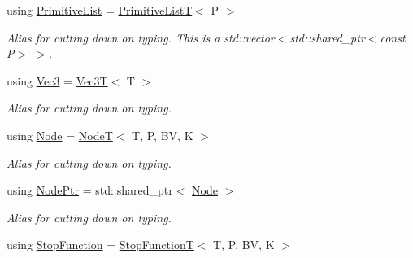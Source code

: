 \begin{DoxyCompactItemize}
\item 
\mbox{\label{classBVH_1_1NodeT_a19cce6e7fbe85eccb4a3718dd69f49b7}} 
using \hyperlink{classBVH_1_1NodeT_a19cce6e7fbe85eccb4a3718dd69f49b7}{Primitive\+List} = \hyperlink{namespaceBVH_aa1e753bda451b85cd5b948722a2ad7c7}{Primitive\+ListT}$<$ P $>$
\begin{DoxyCompactList}\small\item\em Alias for cutting down on typing. This is a std\+::vector$<$std\+::shared\+\_\+ptr$<$const P$>$ $>$. \end{DoxyCompactList}\item 
\mbox{\label{classBVH_1_1NodeT_a6fbb4308c5c55ee170c5f992df7ae1d0}} 
using \hyperlink{classBVH_1_1NodeT_a6fbb4308c5c55ee170c5f992df7ae1d0}{Vec3} = \hyperlink{classVec3T}{Vec3T}$<$ T $>$
\begin{DoxyCompactList}\small\item\em Alias for cutting down on typing. \end{DoxyCompactList}\item 
\mbox{\label{classBVH_1_1NodeT_ac52d9b56f082002c7f8be91062c40ff8}} 
using \hyperlink{classBVH_1_1NodeT_ac52d9b56f082002c7f8be91062c40ff8}{Node} = \hyperlink{classBVH_1_1NodeT}{NodeT}$<$ T, P, BV, K $>$
\begin{DoxyCompactList}\small\item\em Alias for cutting down on typing. \end{DoxyCompactList}\item 
\mbox{\label{classBVH_1_1NodeT_a008f5c2c53adb1f5730d8478b48529b1}} 
using \hyperlink{classBVH_1_1NodeT_a008f5c2c53adb1f5730d8478b48529b1}{Node\+Ptr} = std\+::shared\+\_\+ptr$<$ \hyperlink{classBVH_1_1NodeT_ac52d9b56f082002c7f8be91062c40ff8}{Node} $>$
\begin{DoxyCompactList}\small\item\em Alias for cutting down on typing. \end{DoxyCompactList}\item 
\mbox{\label{classBVH_1_1NodeT_acbe56195affc439febe8aca84db308e3}} 
using \hyperlink{classBVH_1_1NodeT_acbe56195affc439febe8aca84db308e3}{Stop\+Function} = \hyperlink{namespaceBVH_afef1c5979c34a11d23b756cc09654bf9}{Stop\+FunctionT}$<$ T, P, BV, K $>$

\end{DoxyCompactItemize}
